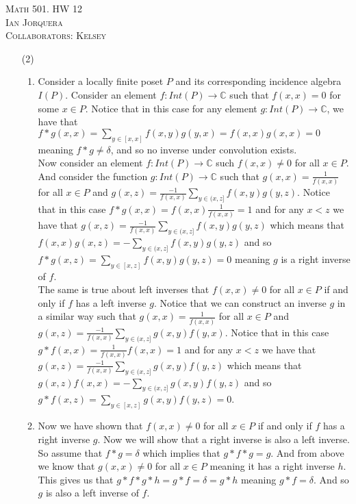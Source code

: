 \documentclass[12pt]{amsart}
\theoremstyle{definition}
\newcommand{\C}{\mathbb{C}}
\newcommand{\ra}{\rightarrow}
\begin{document}
\begin{center}
    \textsc{Math 501. HW 12\\ Ian Jorquera\\ Collaborators: Kelsey}
\end{center}
\vspace{1em}

\begin{itemize}

\item[(2)]
\begin{enumerate}[label=(\alph*)]
    \item %
    Consider a locally finite poset $P$ and its corresponding incidence algebra $I(P)$. Consider an element $f:Int(P)\ra \C$ such that $f(x,x)=0$ for some $x\in P$. Notice that in this case for any element $g:Int(P)\ra \C$, we have that $f* g(x,x)=\sum_{y\in[x,x]}f(x,y)g(y,x)=f(x,x)g(x,x)=0$ meaning $f* g\neq \delta$, and so no inverse under convolution exists.\\ 
    Now consider an element $f:Int(P)\ra \C$ such $f(x,x)\neq 0$ for all $x\in P$. And consider the function $g:Int(P)\ra \C$ such that $g(x,x)=\frac{1}{f(x,x)}$ for all $x\in P$ and $g(x,z)=\frac{-1}{f(x,x)}\sum_{y\in(x,z]}f(x,y)g(y,z)$. Notice that in this case $f*g(x,x)=f(x,x)\frac{1}{f(x,x)}=1$ and for any $x<z$ we have that $g(x,z)=\frac{-1}{f(x,x)}\sum_{y\in(x,z]}f(x,y)g(y,z)$ which means that $f(x,x)g(x,z)=-\sum_{y\in(x,z]}f(x,y)g(y,z)$ and so $f*g(x,z)=\sum_{y\in[x,z]}f(x,y)g(y,z)=0$ meaning $g$ is a right inverse of $f$.\\

    The same is true about left inverses that $f(x,x)\neq 0$ for all $x\in P$ if and only if $f$ has a left inverse $g$. Notice that we can construct an inverse $g$ in a similar way such that $g(x,x)=\frac{1}{f(x,x)}$ for all $x\in P$ and $g(x,z)=\frac{-1}{f(x,x)}\sum_{y\in(x,z]}g(x,y)f(y,x)$. Notice that in this case $g*f(x,x)=\frac{1}{f(x,x)}f(x,x)=1$ and for any $x<z$ we have that $g(x,z)=\frac{-1}{f(x,x)}\sum_{y\in(x,z]}g(x,y)f(y,z)$ which means that $g(x,z)f(x,x)=-\sum_{y\in(x,z]}g(x,y)f(y,z)$ and so $g*f(x,z)=\sum_{y\in[x,z]}g(x,y)f(y,z)=0$.\\

    \item %
    Now we have shown that $f(x,x)\neq 0$ for all $x\in P$ if and only if $f$ has a right inverse $g$. Now we will show that a right inverse is also a left inverse. So assume that $f*g=\delta$ which implies that $g*f*g=g$. And from above we know that $g(x,x)\neq 0$ for all $x\in P$ meaning it has a right inverse $h$. This gives us that $g*f*g*h=g*f=\delta=g*h$ meaning $g*f=\delta$. And so $g$ is also a left inverse of $f$.\\
    

\end{enumerate}
\end{itemize}
\end{document}
